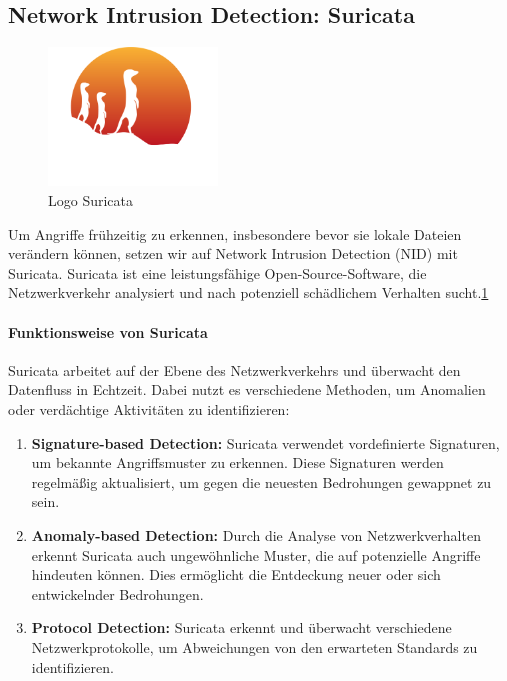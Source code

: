 \documentclass{article}
\begin{document}
\subsection{Network Intrusion Detection: Suricata}
\begin{figure}[ht]
    \centering
    \includegraphics[width=0.4\textwidth]{assets/Suricata.png}
    \caption[\href{https://suricata.io/wp-content/uploads/2021/01/Logo-FINAL_Vertical_Color_Whitetext.png}{Logo Suricata von Suricata}]{\label{fig:Suricata}Logo Suricata}
\end{figure}
Um Angriffe frühzeitig zu erkennen, insbesondere bevor sie lokale Dateien verändern können, setzen wir auf Network Intrusion Detection (NID) mit Suricata. Suricata ist eine leistungsfähige Open-Source-Software, die Netzwerkverkehr analysiert und nach potenziell schädlichem Verhalten sucht.\ref{fig:Suricata}

\paragraph{Funktionsweise von Suricata}
Suricata arbeitet auf der Ebene des Netzwerkverkehrs und überwacht den Datenfluss in Echtzeit. Dabei nutzt es verschiedene Methoden, um Anomalien oder verdächtige Aktivitäten zu identifizieren:

\begin{enumerate}
    \item \textbf{Signature-based Detection:} Suricata verwendet vordefinierte Signaturen, um bekannte Angriffsmuster zu erkennen. Diese Signaturen werden regelmäßig aktualisiert, um gegen die neuesten Bedrohungen gewappnet zu sein.
    \item \textbf{Anomaly-based Detection:} Durch die Analyse von Netzwerkverhalten erkennt Suricata auch ungewöhnliche Muster, die auf potenzielle Angriffe hindeuten können. Dies ermöglicht die Entdeckung neuer oder sich entwickelnder Bedrohungen.
    \item \textbf{Protocol Detection:} Suricata erkennt und überwacht verschiedene Netzwerkprotokolle, um Abweichungen von den erwarteten Standards zu identifizieren.
\end{enumerate}
\end{document}
